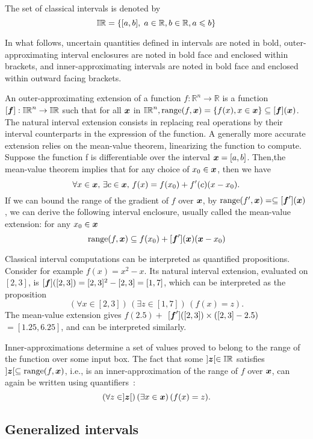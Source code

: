 \documentclass{sig-alternate-05-2015} %
\def\R{{\mathbb R}}
\DeclareMathOperator{\range}{range}
\def\bbr{{\Bbb R}}
\def\I{{\Bbb I \Bbb R}}
\begin{document}
The set of classical intervals is 
denoted by $$\I = \{ [a,b], \; a\in \bbr, b \in \bbr, a \leqslant b\}$$ 

In what follows, 
uncertain quantities defined in intervals are noted in bold, outer-approximating interval enclosures are noted in bold face and enclosed within brackets, 
and inner-approximating intervals are noted in bold face and enclosed within outward facing 
brackets.

 An outer-approximating extension of a function $f: \R^n \rightarrow \R $ is a function 
$[\f]: \I^n\rightarrow \I$ such that for all $\x$ in $\I^n, \mbox{range}(f,\x)=\{f(x), x \in \x\} \subseteq [\f](\x)$.
The natural interval extension consists in replacing real
operations by their interval counterparts in the expression of the function. 
A generally more accurate extension relies on the mean-value theorem, linearizing the 
function to compute. Suppose the function f is differentiable over the interval 
$\x = [a, b]$. Then,the mean-value theorem implies that for any choice of $x_0 \in \x$, then we have
\[ \forall x \in \x, \, \exists c \in \x, \, f(x) = f(x_0) + f'(c) (x-x_0).\]
If we can bound the range of the gradient of $f$ over $\x$, by $\mbox{range}(f',\x)=\subseteq [\f'](\x)$, we can 
derive the following interval enclosure, usually called the mean-value extension: for any  $x_0 \in \x$
\[    \mbox{range}(f,\x)  \subseteq f(x_0) +  [\f'](\x) (\x - x_0) \]

Classical interval computations can be interpreted as quantified 
propositions. Consider for example $f(x)=x^2-x$.
Its natural interval extension, evaluated on $[2,3]$, is 
$[\f]([2,3])=[2,3]^2-[2,3]=[1,7]$, which can be interpreted as the proposition 
\[ (\forall x \in [2,3]) \, (\exists z \in [1,7]) \, (f(x)=z).    \]
The mean-value extension gives
$f(2.5) + $ $[\f']([2, 3]) \times ([2, 3] - 2.5)$ $ = [1.25, 6.25]$, and can be interpreted similarly.

Inner-approximations determine a set of values proved to belong to the range of the function over some input box. 
The fact that some $]\z[ \in \I$ satisfies $]\z[ \subseteq \range(f,\x)$, i.e., is an inner-approximation of the range 
of $f$ over $\x$, can again be written using quantifiers~: 
\[ (\forall z \in ]\z[) \, (\exists x \in \x) \, (f(x)=z).    \]

\subsection{Generalized intervals}
\label{Kaucherar}
\end{document}
